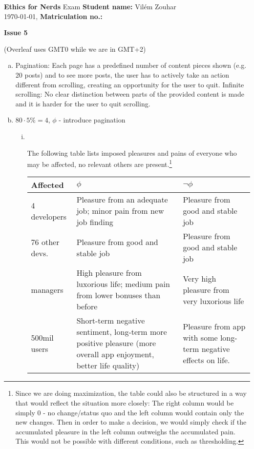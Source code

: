 \documentclass[a4paper, 11pt]{article}
\newcommand{\stdn}{} \newcommand{\studentname}[1]{\renewcommand{\stdn}{#1}}
\newcommand{\mtrk}{} \newcommand{\matriculationno}[1]{\renewcommand{\mtrk}{#1}}
\newcommand{\isnr}{} \newcommand{\issuenumber}[1]{\renewcommand{\isnr}{#1}}
\newcommand{\makeheader}{\textbf{Ethics for Nerds} Exam \hfill \textbf{Student name:} \stdn \\ \today, \currenttime \hfill \textbf{Matriculation no.:} \mtrk \par \textbf{\Large Issue \isnr}}
\begin{document}
\sffamily


\studentname{Vilém Zouhar} %
\matriculationno{} %
\issuenumber{5} %
\makeheader %


(Overleaf uses GMT0 while we are in GMT+2)

\begin{enumerate}[a)]
    \item
    Pagination: Each page has a predefined number of content pieces shown (e.g. 20 posts) and to see more posts, the user has to actively take an action different from scrolling, creating an opportunity for the user to quit. Infinite scrolling: No clear distinction between parts of the provided content is made and it is harder for the user to quit scrolling.
    
    \item
    $80\cdot 5\% = 4$, $\phi$ - introduce pagination
    
    \begin{enumerate}[i)]
        \item
        \, \vspace{-0.65cm}
        
        The following table lists imposed pleasures and pains of everyone who may be affected, no relevant others are present.\footnote{
        Since we are doing maximization, the table could also be structured in a way that would reflect the situation more closely: The right column would be simply $0$ - no change/status quo and the left column would contain only the new changes. Then in order to make a decision, we would simply check if the accumulated pleasure in the left column outweighs the accumulated pain. This would not be possible with different conditions, such as thresholding.
        }
        
        \begin{tabular}{l|p{5cm}p{5cm}}
        Affected & $\phi$ & $\neg \phi$ \\
        \hline
        4 developers & Pleasure from an adequate job; minor pain from new job finding & Pleasure from good and stable job \\
        76 other devs. & Pleasure from good and stable job & Pleasure from good and stable job \\
        managers & High pleasure from luxorious life; medium pain from lower bonuses than before & Very high pleasure from very luxorious life \\
        500mil users & Short-term negative sentiment, long-term more positive pleasure (more overall app enjoyment, better life quality) & Pleasure from app with some long-term negative effects on life.\\
        \end{tabular}
        

\end{enumerate}
\end{enumerate}
\end{document}
